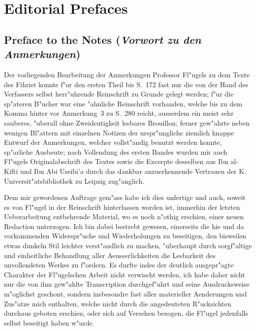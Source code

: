 \documentclass[11pt,a4paper]{article}
\newenvironment{german}{\germanfont}{}
\begin{document}
\section*{Editorial Prefaces}

\subsection*{Preface to the Notes (\textit{Vorwort zu den Anmerkungen})}

\begin{german}

Der vorliegenden Bearbeitung der Anmerkungen Professor Fl"ugels zu dem
Texte des Fihrist konnte f"ur den ersten Theil bis S.~172 fast nur die
von der Hand des Verfassers selbst herr"uhrende Reinschrift zu Grunde
gelegt werden; f"ur die sp"ateren B"ucher war eine "ahnliche Reinschrift
vorhanden, welche bis zu dem Komma hinter vor Anmerkung~3 zu S.~280
reicht, ausserdem ein meist sehr sauberes, "uberall ohne Zweideutigkeit
lesbares Brouillon; ferner gew"ahrte neben wenigen Bl"attern mit einzelnen
Notizen der urspr"ungliche ziemlich knappe Entwurf der Anmerkungen,
welcher vollst"andig benutzt werden konnte, sp"arliche Ausbeute; nach
Vollendung des ersten Bandes wurden mir auch Fl"ugels Originalabschrift
des Textes sowie die Excerpte desselben aus Ibn al-Kifti und Ibn Abi
Useibi'a durch das dankbar anzuerkennende Vertrauen der K.
Universit"atsbibliothek zu Leipzig zug"anglich.

\smallskip

Dem mir gewordenen Auftrage gem"ass habe ich dies unfertige und auch,
soweit es von Fl"ugel in der Reinschrift hinterlassen worden ist, immerhin
der letzten Ueberarbeitung entbehrende Material, wo es noch n"othig
erschien, einer neuen Redaction unterzogen. Ich bin dabei bestrebt
gewesen, einerseits die hie und da vorkommenden Widerspr"uche und
Wiederholungen zu beseitigen, den bisweilen etwas dunkeln Stil leichter
verst"andlich zu machen, "uberhaupt durch sorgf"altige und einheitliche
Behandlung aller Aeusserlichkeiten die Lesbarkeit des unvollendeten
Werkes zu f"ordern. Es durfte indes der deutlich ausgepr"agte Charakter
der Fl"ugelschen Arbeit nicht verwischt werden, ich habe daher nicht nur
die von ihm gew"ahlte Transcription durchgef"uhrt und seine Ausdrucksweise
m"oglichst geschont, sondern insbesondre fast aller materieller
Aenderungen und Zus"atze mich enthalten, welche nicht durch die
angedeuteten R"ucksichten durchaus geboten erschien, oder sich auf
Versehen bezogen, die Fl"ugel jedenfalls selbst beseitigt haben w"urde.


\end{german}
\end{document}
